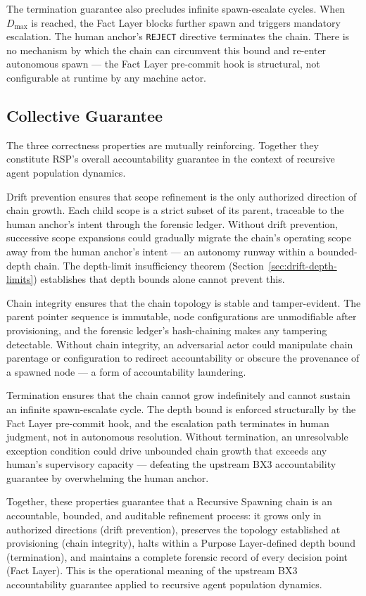 \medskip
The termination guarantee also precludes infinite spawn-escalate cycles. When $D_{\text{max}}$ is reached, the Fact Layer blocks further spawn and triggers mandatory escalation. The human anchor's \texttt{REJECT} directive terminates the chain. There is no mechanism by which the chain can circumvent this bound and re-enter autonomous spawn --- the Fact Layer pre-commit hook is structural, not configurable at runtime by any machine actor.

\subsection{Collective Guarantee}
\label{sec:rs-collective-guarantee}

The three correctness properties are mutually reinforcing. Together they constitute RSP's overall accountability guarantee in the context of recursive agent population dynamics.

\medskip
Drift prevention ensures that scope refinement is the only authorized direction of chain growth. Each child scope is a strict subset of its parent, traceable to the human anchor's intent through the forensic ledger. Without drift prevention, successive scope expansions could gradually migrate the chain's operating scope away from the human anchor's intent --- an autonomy runway within a bounded-depth chain. The depth-limit insufficiency theorem (Section~\ref{sec:drift-depth-limits}) establishes that depth bounds alone cannot prevent this.

Chain integrity ensures that the chain topology is stable and tamper-evident. The parent pointer sequence is immutable, node configurations are unmodifiable after provisioning, and the forensic ledger's hash-chaining makes any tampering detectable. Without chain integrity, an adversarial actor could manipulate chain parentage or configuration to redirect accountability or obscure the provenance of a spawned node --- a form of accountability laundering.

Termination ensures that the chain cannot grow indefinitely and cannot sustain an infinite spawn-escalate cycle. The depth bound is enforced structurally by the Fact Layer pre-commit hook, and the escalation path terminates in human judgment, not in autonomous resolution. Without termination, an unresolvable exception condition could drive unbounded chain growth that exceeds any human's supervisory capacity --- defeating the upstream BX3 accountability guarantee by overwhelming the human anchor.

Together, these properties guarantee that a Recursive Spawning chain is an accountable, bounded, and auditable refinement process: it grows only in authorized directions (drift prevention), preserves the topology established at provisioning (chain integrity), halts within a Purpose Layer-defined depth bound (termination), and maintains a complete forensic record of every decision point (Fact Layer). This is the operational meaning of the upstream BX3 accountability guarantee applied to recursive agent population dynamics.
